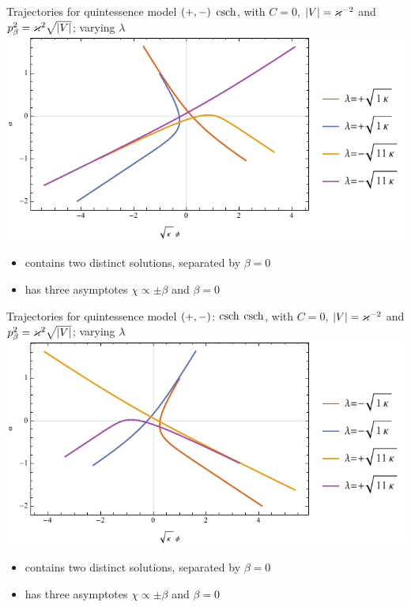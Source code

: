 \documentclass[9pt]{beamer}
\begin{document}
\begin{frame}%
{Trajectories for quintessence model ${\left(+,-\right)}$}%
{$\operatorname{csch}$, with $C = 0$, ${\left|V\right|} = \varkappa^{-2}$ and
$p_\beta^2 = \varkappa^2\sqrt{{\left|V\right|}}$; varying $\lambda$}
\includegraphics[width=\textwidth]{./plots.nb/csch_lamb_l.pdf}
\begin{itemize}
	\item contains two distinct solutions, separated by $\beta = 0$
	\item has three asymptotes $\chi \propto \pm \beta$ and $\beta = 0$
\end{itemize}
\end{frame}

\begin{frame}%
{Trajectories for quintessence model ${\left(+,-\right)}$: $\operatorname{csch}$}%
{$\operatorname{csch}$, with $C = 0$, ${\left|V\right|} = \varkappa^{-2}$ and
$p_\beta^2 = \varkappa^2\sqrt{{\left|V\right|}}$; varying $\lambda$}
\includegraphics[width=\textwidth]{./plots.nb/csch_lamb_r.pdf}
\begin{itemize}
	\item contains two distinct solutions, separated by $\beta = 0$
	\item has three asymptotes $\chi \propto \pm \beta$ and $\beta = 0$
\end{itemize}
\end{frame}
\end{document}
